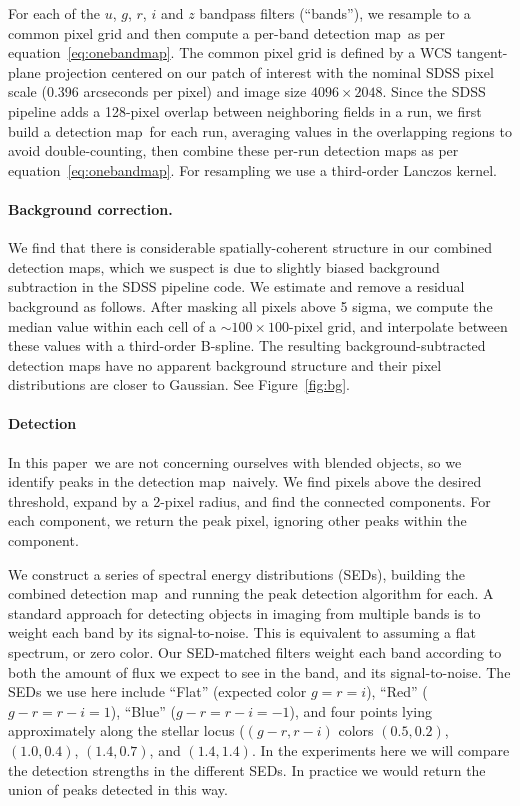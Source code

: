 \documentclass[letterpaper,preprint]{aastex}
\newcommand{\doctype}{paper}
\newcommand{\equationname}{equation}
\newcommand{\eqnref}[1]{\mbox{\equationname~\ref{#1}}}
\newcommand{\fig}{Figure}
\newcommand{\figref}[1]{\mbox{\fig~\ref{#1}}}
\newcommand{\detmap}{detection map}
\begin{document}
For each of the $u$, $g$, $r$, $i$ and $z$ bandpass filters
(``bands''), we resample to a common pixel grid and then compute a
per-band \detmap\ as per \eqnref{eq:onebandmap}.  The common pixel
grid is defined by a WCS tangent-plane projection centered on our
patch of interest with the nominal SDSS pixel scale (0.396 arcseconds
per pixel) and image size $4096 \times 2048$. 
Since the
SDSS pipeline adds a 128-pixel overlap between neighboring fields in a
run, we first build a \detmap\ for each run, averaging values in the
overlapping regions to avoid double-counting, then combine these
per-run \detmap s as per \eqnref{eq:onebandmap}.  For resampling we
use a third-order Lanczos kernel.


\paragraph{Background correction.}
We find that there is considerable spatially-coherent structure in our
combined \detmap s, which we suspect is due to slightly biased
background subtraction in the SDSS pipeline code.  We estimate and
remove a residual background as follows.  After masking all pixels
above 5 sigma, we compute the
median value within each cell of a $\sim 100 \times 100$-pixel grid,
and interpolate between these values with a third-order B-spline.  The
resulting background-subtracted \detmap s have no apparent background
structure and their pixel distributions are closer to Gaussian.  See
\figref{fig:bg}.

\paragraph{Detection}
In this \doctype\ we are not concerning ourselves with blended
objects, so we identify peaks in the \detmap\ naively.  We find
pixels above the desired threshold, expand by a 2-pixel radius, and
find the connected components.  For each component, we return the peak
pixel, ignoring other peaks within the component.


We construct a series of spectral energy distributions (SEDs),
building the combined \detmap\ and running the peak detection
algorithm for each.  A standard approach for detecting objects in
imaging from multiple bands is to weight each band by its
signal-to-noise.  This is equivalent to assuming a flat spectrum, or
zero color.  Our SED-matched filters weight each band according to
both the amount of flux we expect to see in the band, and its
signal-to-noise.  The SEDs we use here include ``Flat'' (expected
color $g = r = i$), ``Red'' ($g-r = r-i = 1$), ``Blue'' ($g-r = r-i =
-1$), and four points lying approximately along the stellar locus
($(g-r, r-i)$ colors $(0.5,0.2)$, $(1.0,0.4)$, $(1.4,0.7)$, and
$(1.4,1.4)$.  In the experiments here we will compare the detection
strengths in the different SEDs.  In practice we would return the
union of peaks detected in this way.
\end{document}

